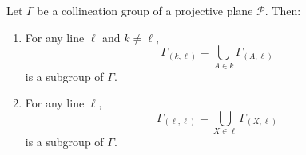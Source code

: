 Let $\Gamma$ be a collineation group of a projective plane $\mathcal{P}$. Then:
\begin{enumerate}
\item[(i)] For any line $\ell$ and $k \neq \ell$, $$\Gamma_{(k,\ell)} = \bigcup_{A \in k} \Gamma_{(A,\ell)}$$ is a subgroup of $\Gamma$.
\item[(ii)] For any line $\ell$, $$\Gamma_{(\ell,\ell)} = \bigcup_{X \in \ell} \Gamma_{(X,\ell)}$$ is a subgroup of $\Gamma$.
\end{enumerate}
